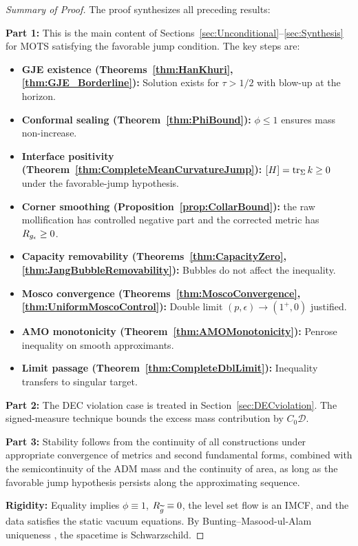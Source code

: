 \begin{proof}[Summary of Proof]
The proof synthesizes all preceding results:

\textbf{Part 1:} This is the main content of Sections~\ref{sec:Unconditional}--\ref{sec:Synthesis} for MOTS satisfying the favorable jump condition. The key steps are:
\begin{itemize}
    \item \textbf{GJE existence (Theorems~\ref{thm:HanKhuri}, \ref{thm:GJE_Borderline}):} Solution exists for $\tau > 1/2$ with blow-up at the horizon.
    \item \textbf{Conformal sealing (Theorem~\ref{thm:PhiBound}):} $\phi \le 1$ ensures mass non-increase.
    \item \textbf{Interface positivity (Theorem~\ref{thm:CompleteMeanCurvatureJump}):} $[H] = \operatorname{tr}_\Sigma k \ge 0$ under the favorable-jump hypothesis.
    \item \textbf{Corner smoothing (Proposition~\ref{prop:CollarBound}):} the raw mollification has controlled negative part and the corrected metric has $R_{g_{\epsilon}} \ge 0$.
    \item \textbf{Capacity removability (Theorems~\ref{thm:CapacityZero}, \ref{thm:JangBubbleRemovability}):} Bubbles do not affect the inequality.
    \item \textbf{Mosco convergence (Theorems~\ref{thm:MoscoConvergence}, \ref{thm:UniformMoscoControl}):} Double limit $(p, \epsilon) \to (1^+, 0)$ justified.
    \item \textbf{AMO monotonicity (Theorem~\ref{thm:AMOMonotonicity}):} Penrose inequality on smooth approximants.
    \item \textbf{Limit passage (Theorem~\ref{thm:CompleteDblLimit}):} Inequality transfers to singular target.
\end{itemize}

\textbf{Part 2:} The DEC violation case is treated in Section~\ref{sec:DECviolation}. The signed-measure technique bounds the excess mass contribution by $C_0 \mathcal{D}$.

\textbf{Part 3:} Stability follows from the continuity of all constructions under appropriate convergence of metrics and second fundamental forms, combined with the semicontinuity of the ADM mass and the continuity of area, as long as the favorable jump hypothesis persists along the approximating sequence.

\textbf{Rigidity:} Equality implies $\phi \equiv 1$, $R_{\widetilde{g}} \equiv 0$, the level set flow is an IMCF, and the data satisfies the static vacuum equations. By Bunting--Masood-ul-Alam uniqueness \cite{buntingmasood1987}, the spacetime is Schwarzschild.
\end{proof}

